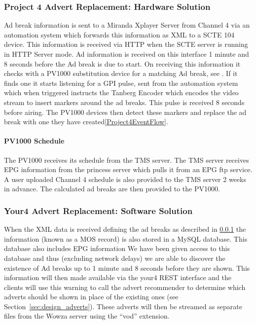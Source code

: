 \subsubsection{Project 4 Advert Replacement: Hardware Solution}\label{subsubsec:Project4Tech}
Ad break information is sent to a Miranda Xplayer Server from Channel 4 via an automation system which forwards this information as XML to a SCTE 104 device. This information is received via HTTP when the SCTE server is running in HTTP Server mode. Ad information is received on this interface 1 minute and 8 seconds before the Ad break is due to start. On receiving this information it checks with a PV1000 substitution device for a matching Ad break, see \citep{PV1000Schedule}. If it finds one it starts listening for a GPI pulse, sent from the automation system which when triggered instructs the Tanberg Encoder which encodes the video stream to insert markers around the ad breaks. This pulse is received 8 seconds before airing. The PV1000 devices then detect these markers and replace the ad break with one they have created\ref{Project4EventFlow}.

\paragraph{PV1000 Schedule}\label{PV1000Schedule}
The PV1000 receives its schedule from the TMS server. The TMS server receives EPG information from the princess server which pulls it from an EPG ftp service. A user uploaded Channel 4 schedule is also provided to the TMS server 2 weeks in advance. The calculated ad breaks are then provided to the PV1000.

\subsubsection{Your4 Advert Replacement: Software Solution}
When the XML data is received defining the ad breaks as described in \ref{subsubsec:Project4Tech} the information (known as a MOS record) is also stored in a MySQL database. This database also includes EPG information We have been given access to this database and thus (excluding network delays) we are able to discover the existence of Ad breaks up to 1 minute and 8 seconds before they are shown. This information will then made available via the your4 REST interface and the clients will use this warning to call the advert recommender to determine which adverts should be shown in place of the existing ones (see Section~\ref{sec:design_adverts}). These adverts will then be streamed as separate files from the Wowza server using the ``vod'' extension.

